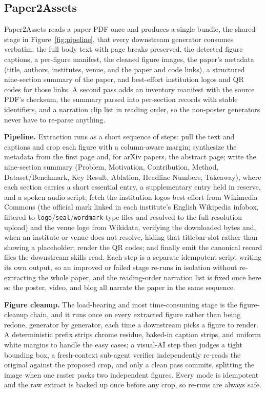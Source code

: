 \documentclass{article}
\begin{document}
\subsection{Paper2Assets}\label{sec:p2a}

Paper2Assets reads a paper PDF once and produces a single bundle, the shared stage in Figure~\ref{fig:pipeline}, that every downstream generator consumes verbatim: the full body text with page breaks preserved, the detected figure captions, a per-figure manifest, the cleaned figure images, the paper's metadata (title, authors, institutes, venue, and the paper and code links), a structured nine-section summary of the paper, and best-effort institution logos and QR codes for those links. A second pass adds an inventory manifest with the source PDF's checksum, the summary parsed into per-section records with stable identifiers, and a narration clip list in reading order, so the non-poster generators never have to re-parse anything.

\textbf{Pipeline.} Extraction runs as a short sequence of steps: pull the text and captions and crop each figure with a column-aware margin; synthesize the metadata from the first page and, for arXiv papers, the abstract page; write the nine-section summary (Problem, Motivation, Contribution, Method, Dataset/Benchmark, Key Result, Ablation, Headline Numbers, Takeaway), where each section carries a short essential entry, a supplementary entry held in reserve, and a spoken audio script; fetch the institution logos best-effort from Wikimedia Commons (the official mark linked in each institute's English Wikipedia infobox, filtered to \texttt{logo}/\texttt{seal}/\texttt{wordmark}-type files and resolved to the full-resolution upload) and the venue logo from Wikidata, verifying the downloaded bytes and, when an institute or venue does not resolve, hiding that titlebar slot rather than showing a placeholder; render the QR codes; and finally emit the canonical record files the downstream skills read. Each step is a separate idempotent script writing its own output, so an improved or failed stage re-runs in isolation without re-extracting the whole paper, and the reading-order narration list is fixed once here so the poster, video, and blog all narrate the paper in the same sequence.

\textbf{Figure cleanup.} The load-bearing and most time-consuming stage is the figure-cleanup chain, and it runs once on every extracted figure rather than being redone, generator by generator, each time a downstream picks a figure to render. A deterministic prefix strips chrome residue, baked-in caption strips, and uniform white margins to handle the easy cases; a visual-AI step then judges a tight bounding box, a fresh-context sub-agent verifier independently re-reads the original against the proposed crop, and only a clean pass commits, splitting the image when one raster packs two independent figures. Every mode is idempotent and the raw extract is backed up once before any crop, so re-runs are always safe.
\end{document}

